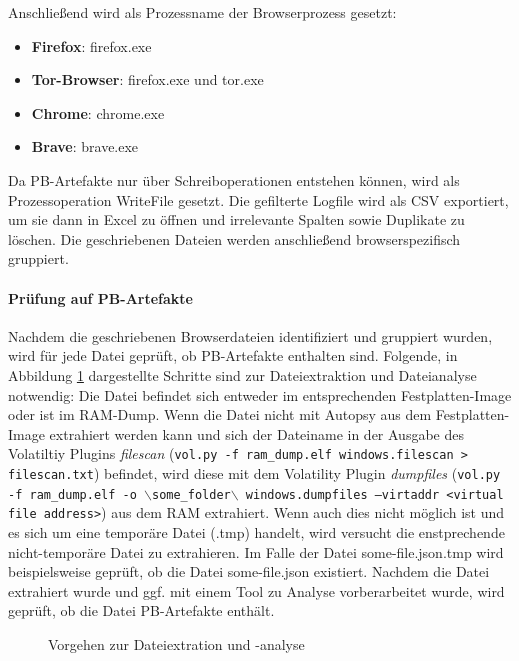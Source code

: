 Anschließend wird als Prozessname der Browserprozess gesetzt:
\begin{itemize}
\item \textbf{Firefox}: firefox.exe
\item \textbf{Tor-Browser}: firefox.exe und tor.exe
\item \textbf{Chrome}: chrome.exe
\item \textbf{Brave}: brave.exe
\end{itemize}
Da PB-Artefakte nur über Schreiboperationen entstehen können, wird als Prozessoperation \glqq{}WriteFile\grqq{} gesetzt.
Die gefilterte Logfile wird als CSV exportiert, um sie dann in Excel zu öffnen und irrelevante Spalten sowie Duplikate zu löschen.
Die geschriebenen Dateien werden anschließend browserspezifisch gruppiert.

\paragraph*{Prüfung auf PB-Artefakte}
Nachdem die geschriebenen Browserdateien identifiziert und gruppiert wurden, wird für jede Datei geprüft, ob PB-Artefakte enthalten sind. Folgende, in Abbildung \ref{img:dateiextraktion-und-analyse} dargestellte Schritte sind zur Dateiextraktion und Dateianalyse notwendig:
Die Datei befindet sich entweder im entsprechenden Festplatten-Image oder ist im RAM-Dump. 
Wenn die Datei nicht mit Autopsy aus dem Festplatten-Image extrahiert werden kann und sich der Dateiname in der Ausgabe des Volatiltiy Plugins \textit{filescan} (\texttt{vol.py -f ram\_dump.elf windows.filescan > filescan.txt}) befindet, wird diese mit dem Volatility Plugin \textit{dumpfiles} (\texttt{vol.py -f ram\_dump.elf -o $\backslash$some\_folder$\backslash$ windows.dumpfiles --virtaddr <virtual file address>}) aus dem RAM extrahiert.
Wenn auch dies nicht möglich ist und es sich um eine temporäre Datei (.tmp) handelt, wird versucht die enstprechende nicht-temporäre Datei zu extrahieren. 
Im Falle der Datei \glqq{}some-file.json.tmp\grqq{} wird beispielsweise geprüft, ob die Datei \glqq{}some-file.json\grqq{} existiert.
Nachdem die Datei extrahiert wurde und ggf. mit einem Tool zu Analyse vorberarbeitet wurde, wird geprüft, ob die Datei PB-Artefakte enthält.
\begin{figure}[h!]
	\centering
	\small
	\centerline{\resizebox{\linewidth}{!}{}}
	\caption{Vorgehen zur Dateiextration und -analyse}
	\label{img:dateiextraktion-und-analyse}
\end{figure}

